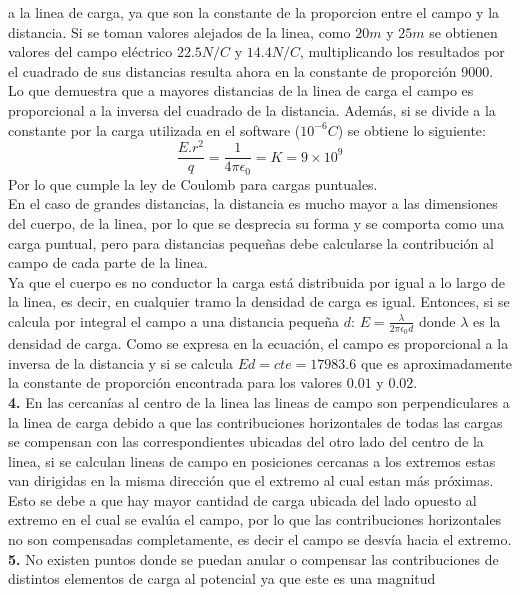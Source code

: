 \documentclass[11pt, letterpaper]{article}
\begin{document}
    a la linea de carga, ya que son la constante de la proporcion entre el
    campo y la distancia. Si se toman valores alejados de la linea, como $20m$
    y $25m$ se obtienen valores del campo eléctrico $22.5N/C$ y $14.4N/C$, 
    multiplicando los resultados por el cuadrado de sus distancias resulta
    ahora en la constante de proporción 9000. Lo que demuestra que a mayores
    distancias de la linea de carga el campo es proporcional a la inversa del
    cuadrado de la distancia. Además, si se divide a la constante por la carga
    utilizada en el software ($10^{-6} C$) se obtiene lo siguiente:
    $$ \frac{E.r^2}{q}= \frac{1}{4\pi \epsilon_0} = K = 9\times 10^9 $$
    Por lo que cumple la ley de Coulomb para cargas puntuales.\\
    En el caso de grandes distancias, la distancia es mucho mayor a las 
    dimensiones del cuerpo, de la linea, por lo que se desprecia su forma
    y se comporta como una carga puntual, pero para distancias pequeñas
    debe calcularse la contribución al campo de cada parte de la linea.\\
    Ya que el cuerpo es no conductor la carga está distribuida por igual
    a lo largo de la linea, es decir, en cualquier tramo la densidad de
    carga es igual. Entonces, si se calcula por integral el campo a una
    distancia pequeña $d$: $E = \frac{\lambda}{2 \pi \epsilon_0 d}$
    donde $\lambda$ es la densidad de carga. Como se expresa en la ecuación,
    el campo es proporcional a la inversa de la distancia y si se calcula
    $Ed = cte = 17983.6$ que es aproximadamente la constante de
    proporción encontrada para los valores $0.01$ y $0.02$.\\
    \textbf{4.} En las cercanías al centro de la linea las lineas de campo son 
    perpendiculares a la linea de carga debido a que las contribuciones
    horizontales de todas las cargas se compensan con las correspondientes
    ubicadas del otro lado del centro de la linea, si se calculan lineas
    de campo en posiciones cercanas a los extremos estas van dirigidas en la
    misma dirección que el extremo al cual estan más próximas. Esto se debe
    a que hay mayor cantidad de carga ubicada del lado opuesto al extremo
    en el cual se evalúa el campo, por lo que las contribuciones 
    horizontales no son compensadas completamente, es decir el campo se desvía
    hacia el extremo.\\
    \textbf{5.} No existen puntos donde se puedan anular o compensar las contribuciones
    de distintos elementos de carga al potencial ya que este es una magnitud 
\end{document}

